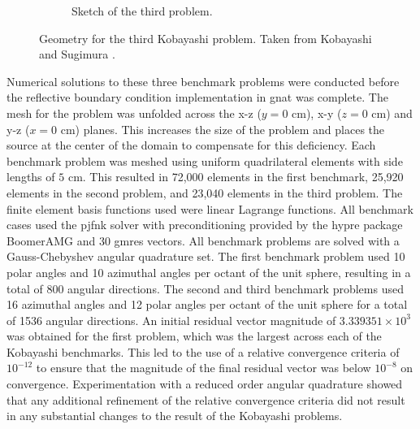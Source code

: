 \begin{figure}[H]
\begin{subfigure}[b]{0.45\textwidth}
        \caption{Sketch of the third problem.}
        \label{fig:verification:sn_kobayashi_3_geo:2}
    \end{subfigure}
    \caption[Geometry for the third Kobayashi problem.]{Geometry for the third Kobayashi problem. Taken from Kobayashi and Sugimura \cite{kobayashi_benchmarks}.}
    \label{fig:verification:sn_kobayashi_3_geo}
\end{figure}

Numerical solutions to these three benchmark problems were conducted before the reflective boundary condition implementation in \acrshort{gnat} was complete. The mesh for the problem was unfolded across the x-z ($y = 0\text{ cm}$), x-y ($z = 0\text{ cm}$) and y-z ($x = 0\text{ cm}$) planes. This increases the size of the problem and places the source at the center of the domain to compensate for this deficiency. Each benchmark problem was meshed using uniform quadrilateral elements with side lengths of $5$ cm. This resulted in 72,000 elements in the first benchmark, 25,920 elements in the second problem, and 23,040 elements in the third problem. The finite element basis functions used were linear Lagrange functions. All benchmark cases used the \acrshort{pjfnk} solver with preconditioning provided by the hypre package BoomerAMG and 30 \acrfull{gmres} vectors. All benchmark problems are solved with a Gauss-Chebyshev angular quadrature set. The first benchmark problem used 10 polar angles and 10 azimuthal angles per octant of the unit sphere, resulting in a total of 800 angular directions. The second and third benchmark problems used 16 azimuthal angles and 12 polar angles per octant of the unit sphere for a total of 1536 angular directions. An initial residual vector magnitude of $3.339351\times 10^{3}$ was obtained for the first problem, which was the largest across each of the Kobayashi benchmarks. This led to the use of a relative convergence criteria of $10^{-12}$ to ensure that the magnitude of the final residual vector was below $10^{-8}$ on convergence. Experimentation with a reduced order angular quadrature showed that any additional refinement of the relative convergence criteria did not result in any substantial changes to the result of the Kobayashi problems.

